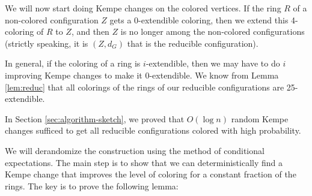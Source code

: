 \documentclass[10pt,a4paper]{article}
\begin{document}
We will now start doing Kempe changes on the colored vertices. If the ring $R$ of a non-colored configuration $Z$ gets a 0-extendible coloring, then we extend this 4-coloring of $R$ to $Z$, and then $Z$ is no longer among the non-colored configurations (strictly speaking, it is $(Z,d_G)$ that is the reducible configuration). 


In general, if the  coloring of a ring is  $i$-extendible, then we may have to
do $i$ improving Kempe changes to make it $0$-extendible. We know from Lemma \ref{lem:reduc} that all colorings of the rings of our reducible configurations are 25-extendible. 

In Section \ref{sec:algorithm-sketch}, we proved
that $O(\log n)$ random Kempe changes sufficed to get all reducible configurations colored with high probability. 

We will derandomize the construction using the method of conditional expectations.
The main step is to show that we can deterministically find a Kempe change that improves the level of coloring for a constant fraction of the rings.
The key is to prove the following lemma:
\end{document}
